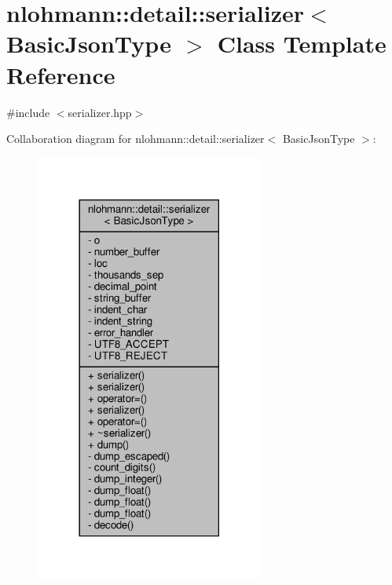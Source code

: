 \hypertarget{classnlohmann_1_1detail_1_1serializer}{}\section{nlohmann\+:\+:detail\+:\+:serializer$<$ Basic\+Json\+Type $>$ Class Template Reference}
\label{classnlohmann_1_1detail_1_1serializer}


{\ttfamily \#include $<$serializer.\+hpp$>$}



Collaboration diagram for nlohmann\+:\+:detail\+:\+:serializer$<$ Basic\+Json\+Type $>$\+:\nopagebreak
\begin{figure}[H]
\begin{center}
\leavevmode
\includegraphics[width=213pt]{classnlohmann_1_1detail_1_1serializer__coll__graph}
\end{center}
\end{figure}
